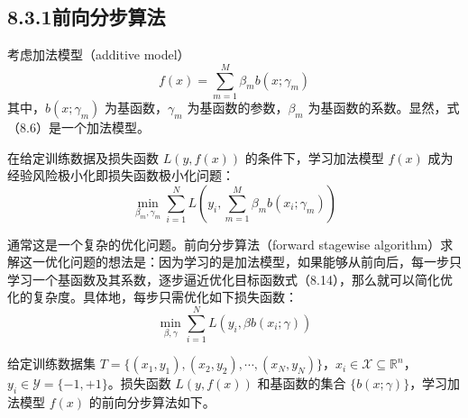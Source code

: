 \documentclass[UTF8, 12pt, fontset=fandol, oneside]{ctexart}
\begin{document}
\subsection*{8.3.1\quad 前向分步算法}

考虑加法模型（additive model）
\begin{equation}
f(x)=\sum_{m=1}^M\beta_m b(x;\gamma_m)
\tag{8.13}
\end{equation}
其中，$b(x;\gamma_m)$ 为基函数，$\gamma_m$ 为基函数的参数，$\beta_m$ 为基函数的系数。显然，式（8.6）是一个加法模型。

在给定训练数据及损失函数 $L(y,f(x))$ 的条件下，学习加法模型 $f(x)$ 成为经验风险极小化即损失函数极小化问题：
\begin{equation}
\min_{\beta_m,\gamma_m}\sum_{i=1}^N
L\left(y_i,\sum_{m=1}^M\beta_m b(x_i;\gamma_m)\right)
\tag{8.14}
\end{equation}

通常这是一个复杂的优化问题。前向分步算法（forward stagewise algorithm）求解这一优化问题的想法是：因为学习的是加法模型，如果能够从前向后，每一步只学习一个基函数及其系数，逐步逼近优化目标函数式（8.14），那么就可以简化优化的复杂度。具体地，每步只需优化如下损失函数：
\begin{equation}
\min_{\beta,\gamma}\sum_{i=1}^N L(y_i,\beta b(x_i;\gamma))
\tag{8.15}
\end{equation}

给定训练数据集 $T=\{(x_1,y_1),(x_2,y_2),\cdots,(x_N,y_N)\}$，$x_i\in\mathcal{X}\subseteq\mathbb{R}^n$，$y_i\in\mathcal{Y}=\{-1,+1\}$。损失函数 $L(y,f(x))$ 和基函数的集合 $\{b(x;\gamma)\}$，学习加法模型 $f(x)$ 的前向分步算法如下。

\begin{center}
\end{center}
\end{document}
